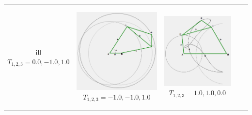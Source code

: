 \documentclass[ucs,10pt]{beamer}
\begin{document}
\begin{frame}
\begin{center}
\begin{tabular}{ c@{\hskip 5pt}c@{\hskip 5pt}c@{\hskip 5pt}c@{\hskip 5pt}c}
ill {\tiny $T_{1,2,3} = 0.0, -1.0, 1.0$}\end{center}\end{minipage}& \begin{minipage}{0.2\linewidth}\begin{center} \includegraphics[width=0.75\linewidth]{./Figures/27_motion_cases/-1-11.png} \hfill {\tiny $T_{1,2,3} = -1.0, -1.0, 1.0$}\end{center}\end{minipage}& \begin{minipage}{0.185\linewidth}\begin{center} \includegraphics[width=0.75\linewidth]{./Figures/27_motion_cases/110.png} \hfill {\tiny $T_{1,2,3} = 1.0, 1.0, 0.0$}\end{center}\end{minipage} \\

\end{tabular}
\end{center}
\end{frame}
\end{document}
